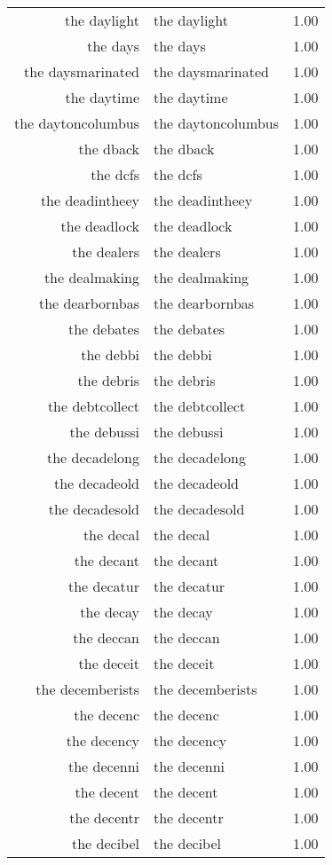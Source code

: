 \begin{table}[ht]
\begin{tabular}{rlr}
  the daylight & the daylight & 1.00 \\ 
  the days & the days & 1.00 \\ 
  the daysmarinated & the daysmarinated & 1.00 \\ 
  the daytime & the daytime & 1.00 \\ 
  the daytoncolumbus & the daytoncolumbus & 1.00 \\ 
  the dback & the dback & 1.00 \\ 
  the dcfs & the dcfs & 1.00 \\ 
  the deadintheey & the deadintheey & 1.00 \\ 
  the deadlock & the deadlock & 1.00 \\ 
  the dealers & the dealers & 1.00 \\ 
  the dealmaking & the dealmaking & 1.00 \\ 
  the dearbornbas & the dearbornbas & 1.00 \\ 
  the debates & the debates & 1.00 \\ 
  the debbi & the debbi & 1.00 \\ 
  the debris & the debris & 1.00 \\ 
  the debtcollect & the debtcollect & 1.00 \\ 
  the debussi & the debussi & 1.00 \\ 
  the decadelong & the decadelong & 1.00 \\ 
  the decadeold & the decadeold & 1.00 \\ 
  the decadesold & the decadesold & 1.00 \\ 
  the decal & the decal & 1.00 \\ 
  the decant & the decant & 1.00 \\ 
  the decatur & the decatur & 1.00 \\ 
  the decay & the decay & 1.00 \\ 
  the deccan & the deccan & 1.00 \\ 
  the deceit & the deceit & 1.00 \\ 
  the decemberists & the decemberists & 1.00 \\ 
  the decenc & the decenc & 1.00 \\ 
  the decency & the decency & 1.00 \\ 
  the decenni & the decenni & 1.00 \\ 
  the decent & the decent & 1.00 \\ 
  the decentr & the decentr & 1.00 \\ 
  the decibel & the decibel & 1.00 \\ 

\end{tabular}
\end{table}
